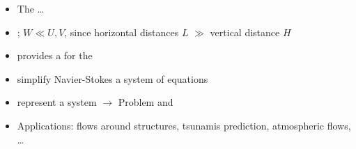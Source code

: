 \begin{frame}
\begin{multicols}{2}
\vfill\columnbreak

\begin{itemize}
\setlength\itemsep{2em}
\item<2->[] The \textbf{} \dots
\item<3-> ;  $ W \ll U,V $, since horizontal distances $L$ $\gg$ vertical distance $H$
\item<4-> provides a  for the 
\item<5-> simplify  Navier-Stokes  a  system of equations
\item<6-> represent a  system $\rightarrow$  Problem and 
\item<7-> Applications: {\small {} flows around structures, tsunamis prediction, atmospheric flows, \dots}
\end{itemize}
\end{multicols}

\end{frame}
\clearpage


